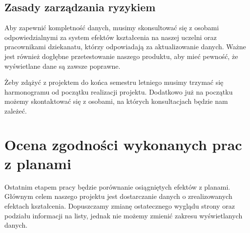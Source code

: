 \documentclass{article}
\begin{document}
\subsection{Zasady zarządzania ryzykiem}
Aby zapewnić kompletność danych, musimy skonsultować się z osobami odpowiedzialnymi za system efektów kształcenia na naszej uczelni oraz pracownikami dziekanatu, którzy odpowiadają
za aktualizowanie danych. Ważne jest również dogłębne przetestowanie naszego produktu, aby mieć pewność, że wyświetlane dane są zawsze poprawne.

Żeby zdążyć z projektem do końca semestru letniego musimy trzymać się harmonogramu od początku realizacji projektu. Dodatkowo już na początku możemy skontaktować się z osobami, 
na których konsultacjach będzie nam zależeć.


\section{Ocena zgodności wykonanych prac z planami}
Ostatnim etapem pracy będzie porównanie osiągniętych efektów z planami. Głównym celem naszego projektu jest dostarczanie danych o zrealizowanych efektach kształcenia.
Dopuszczamy zmianę ostatecznego wyglądu strony oraz podziału informacji na listy, jednak nie możemy zmienić zakresu wyświetlanych danych.
\end{document}
